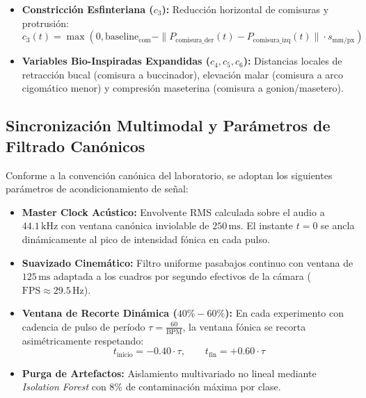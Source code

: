 \documentclass[11pt,a4paper]{report}
\begin{document}
\begin{enumerate}
\begin{itemize}
\begin{equation}
            c_2(t) = \max\left(0, \| P_{\text{comisura\_der}}(t) - P_{\text{comisura\_izq}}(t) \| \cdot s_{\text{mm/px}} - \text{baseline}_{\text{com}}\right)
        \end{equation}
        \item \textbf{Constricción Esfinteriana ($c_3$):} Reducción horizontal de comisuras y protrusión:
        \begin{equation}
            c_3(t) = \max\left(0, \text{baseline}_{\text{com}} - \| P_{\text{comisura\_der}}(t) - P_{\text{comisura\_izq}}(t) \| \cdot s_{\text{mm/px}}\right)
        \end{equation}
        \item \textbf{Variables Bio-Inspiradas Expandidas ($c_4, c_5, c_6$):} Distancias locales de retracción bucal (comisura a buccinador), elevación malar (comisura a arco cigomático menor) y compresión maseterina (comisura a gonion/masetero).
    \end{itemize}
\end{enumerate}

\subsection{Sincronización Multimodal y Parámetros de Filtrado Canónicos}
Conforme a la convención canónica del laboratorio, se adoptan los siguientes parámetros de acondicionamiento de señal:
\begin{itemize}
    \item \textbf{Master Clock Acústico:} Envolvente RMS calculada sobre el audio a $44.1\,\text{kHz}$ con ventana canónica inviolable de $250\,\text{ms}$. El instante $t=0$ se ancla dinámicamente al pico de intensidad fónica en cada pulso.
    \item \textbf{Suavizado Cinemático:} Filtro uniforme pasabajos continuo con ventana de $125\,\text{ms}$ adaptada a los cuadros por segundo efectivos de la cámara ($\text{FPS} \approx 29.5\,\text{Hz}$).
    \item \textbf{Ventana de Recorte Dinámica ($40\% - 60\%$):} En cada experimento con cadencia de pulso de período $\tau = \frac{60}{\text{BPM}}$, la ventana fónica se recorta asimétricamente respetando:
    \begin{equation}
        t_{\text{inicio}} = -0.40 \cdot \tau, \qquad t_{\text{fin}} = +0.60 \cdot \tau
    \end{equation}
    \item \textbf{Purga de Artefactos:} Aislamiento multivariado no lineal mediante \textit{Isolation Forest} con 8\% de contaminación máxima por clase.
\end{itemize}
\end{document}
